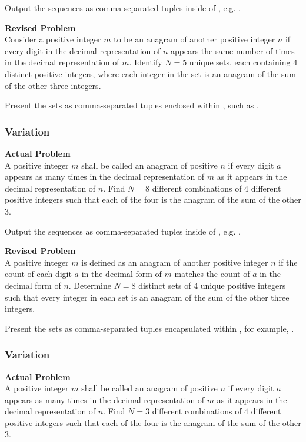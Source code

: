 Output the sequences as comma-separated tuples inside of \boxed, e.g. .

\textbf{Revised Problem}\\
Consider a positive integer $m$ to be an anagram of another positive integer $n$ if every digit in the decimal representation of $n$ appears the same number of times in the decimal representation of $m$. Identify $N=5$ unique sets, each containing $4$ distinct positive integers, where each integer in the set is an anagram of the sum of the other three integers.

Present the sets as comma-separated tuples enclosed within \boxed, such as .

\subsubsection{Variation}
\textbf{Actual Problem}\\
A positive integer $m$ shall be called an anagram of positive $n$ if every digit $a$ appears as many times in the decimal representation of $m$ as it appears in the decimal representation of $n$. Find $N=8$ different combinations of $4$ different positive integers such that each of the four is the anagram of the sum of the other $3$.

Output the sequences as comma-separated tuples inside of \boxed, e.g. .

\textbf{Revised Problem}\\
A positive integer $m$ is defined as an anagram of another positive integer $n$ if the count of each digit $a$ in the decimal form of $m$ matches the count of $a$ in the decimal form of $n$. Determine $N=8$ distinct sets of $4$ unique positive integers such that every integer in each set is an anagram of the sum of the other three integers.

Present the sets as comma-separated tuples encapsulated within \boxed, for example, .

\subsubsection{Variation}
\textbf{Actual Problem}\\
A positive integer $m$ shall be called an anagram of positive $n$ if every digit $a$ appears as many times in the decimal representation of $m$ as it appears in the decimal representation of $n$. Find $N=3$ different combinations of $4$ different positive integers such that each of the four is the anagram of the sum of the other $3$.

